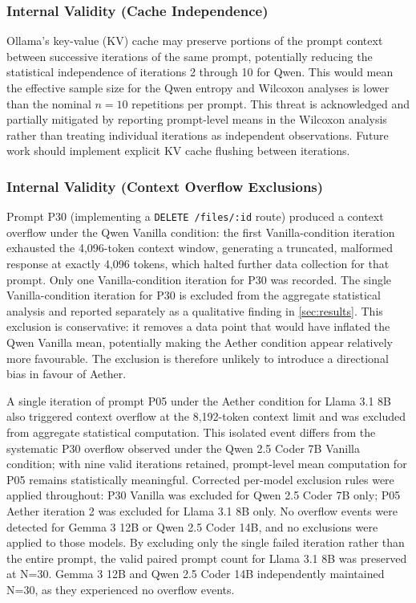 \documentclass[review,12pt,3p]{elsarticle}
\begin{document}
\subsubsection{Internal Validity (Cache Independence)}

Ollama's key-value (KV) cache may preserve portions of the prompt context between successive
iterations of the same prompt, potentially reducing the statistical independence of
iterations 2 through 10 for Qwen. This would mean the effective sample size for the
Qwen entropy and Wilcoxon analyses is lower than the nominal $n = 10$ repetitions per
prompt. This threat is acknowledged and partially mitigated by reporting prompt-level
means in the Wilcoxon analysis rather than treating individual iterations as independent
observations. Future work should implement explicit KV cache flushing between iterations.

\subsubsection{Internal Validity (Context Overflow Exclusions)}

Prompt P30 (implementing a \texttt{DELETE /files/:id} route) produced a context overflow
under the Qwen Vanilla condition: the first Vanilla-condition iteration exhausted the
4,096-token context window, generating a truncated, malformed response at exactly 4,096
tokens, which halted further data collection for that prompt. Only one Vanilla-condition
iteration for P30 was recorded. The single Vanilla-condition iteration for P30 is excluded
from the aggregate statistical analysis and reported separately as a qualitative finding
in \cref{sec:results}. This exclusion is conservative: it removes a data point that would
have inflated the Qwen Vanilla mean, potentially making the Aether condition appear
relatively more favourable. The exclusion is therefore unlikely to introduce a directional
bias in favour of Aether.

A single iteration of prompt P05 under the Aether condition for Llama 3.1 8B also triggered
context overflow at the 8,192-token context limit and was excluded from aggregate statistical
computation. This isolated event differs from the systematic P30 overflow observed under the
Qwen 2.5 Coder 7B Vanilla condition; with nine valid iterations retained, prompt-level mean
computation for P05 remains statistically meaningful. Corrected per-model exclusion rules
were applied throughout: P30 Vanilla was excluded for Qwen 2.5 Coder 7B only; P05 Aether
iteration 2 was excluded for Llama 3.1 8B only. No overflow events were detected for Gemma
3 12B or Qwen 2.5 Coder 14B, and no exclusions were applied to those models. By excluding only 
the single failed iteration rather than the entire prompt, the valid paired prompt count for 
Llama 3.1 8B was preserved at N=30. Gemma 3 12B and Qwen 2.5 
Coder 14B independently maintained N=30, as they experienced no overflow events.
\end{document}
